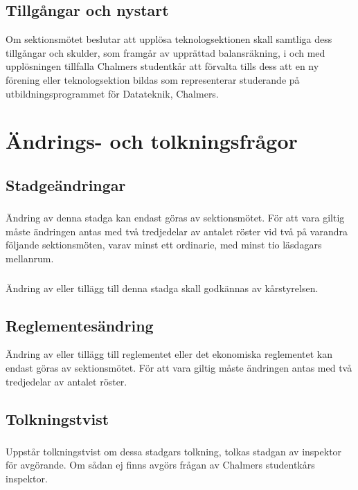 \documentclass[a4paper]{dtek}
\begin{document}
\subsection{Tillgångar och nystart}
Om sektionsmötet beslutar att upplösa teknologsektionen skall samtliga dess tillgångar och skulder, som framgår av upprättad balansräkning, i och med upplösningen tillfalla Chalmers studentkår att förvalta tills dess att en ny förening eller teknologsektion bildas som representerar studerande på utbildningsprogrammet för Datateknik, Chalmers.
\newpage

\section{Ändrings- och tolkningsfrågor}
\subsection{Stadgeändringar}
\subsubsection{}
Ändring av denna stadga kan endast göras av sektionsmötet. För att vara giltig måste ändringen antas med två tredjedelar av antalet röster vid två på varandra följande sektionsmöten, varav minst ett ordinarie, med minst tio läsdagars mellanrum.
\subsubsection{}
Ändring av eller tillägg till denna stadga skall godkännas av kårstyrelsen.
\subsection{Reglementesändring}
Ändring av eller tillägg till reglementet eller det ekonomiska reglementet kan endast göras av sektionsmötet. För att vara giltig måste ändringen antas med två tredjedelar av antalet röster.
\subsection{Tolkningstvist}
\subsubsection{}
Uppstår tolkningstvist om dessa stadgars tolkning, tolkas stadgan av inspektor för avgörande. Om sådan ej finns avgörs frågan av Chalmers studentkårs inspektor.
\end{document}
